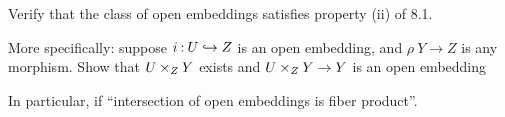 \documentclass[12pt]{memoir}
\begin{document}
\begin{Ej}
    Verify that the class of open embeddings satisfies property (ii) of 8.1.\par
    More specifically: suppose $i\mathbin{:} U\hookrightarrow Z$ is an open embedding, and $\rho\: Y\to Z$ is any morphism. Show that $U\times_ZY$ exists and $U\times_ZY\to Y$ is an open embedding
    \par
    In particular, if “intersection of open embeddings is fiber product”.

\end{Ej}
\end{document}
